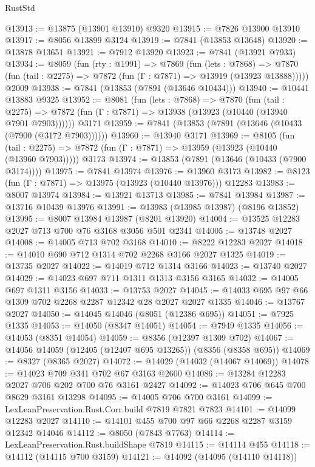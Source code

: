 \begin{lexlean}{RustStd}
\begin{coremodule}
@13913 := @13875 (@13901 @13910) @9320
@13915 := @7826 @13900 @13910
@13917 := @8056 @13899 @3124
@13919 := @7841 (@13853 @13648)
@13920 := @13878 @13651
@13921 := @7912 @13920
@13923 := @7841 (@13921 @7933)
@13934 := @8059
    (fun (rty : @1991) =>
    @7869
      (fun (lets : @7868) =>
      @7870 (fun (tail : @2275) => @7872 (fun (Γ : @7871) => @13919 (@13923 @13888)))))
    @2009
@13938 := @7841 (@13853 (@7891 (@13646 @10434)))
@13940 := @10441 @13883 @9325
@13952 := @8081
    (fun (lets : @7868) =>
    @7870
      (fun (tail : @2275) =>
      @7872 (fun (Γ : @7871) => @13938 (@13923 (@10440 (@13940 @7901 @7903))))))
    @3171
@13959 := @7841 (@13853 (@7891 (@13646 (@10433 (@7900 (@3172 @7903))))))
@13960 := @13940 @3171
@13969 := @8105
    (fun (tail : @2275) => @7872 (fun (Γ : @7871) => @13959 (@13923 (@10440 (@13960 @7903)))))
    @3173
@13974 := @13853 (@7891 (@13646 (@10433 (@7900 @3174))))
@13975 := @7841 @13974
@13976 := @13960 @3173
@13982 := @8123 (fun (Γ : @7871) => @13975 (@13923 (@10440 @13976))) @12283
@13983 := @8007 @13974
@13984 := @13921 @13713
@13985 := @7841 @13984
@13987 := @13716 @10439 @13976
@13991 := @13983 (@13985 @13987) (@8196 @13852)
@13995 := @8007 @13984 @13987 (@8201 @13920)
@14004 := @13525 @12283 @2027 @713 @700 @76 @3168 @3056 @501 @2341
@14005 := @13748 @2027
@14008 := @14005 @713 @702 @3168
@14010 := @8222 @12283 @2027
@14018 := @14010 @690 @712 @1314 @702 @2268 @3166 @2027 @1325
@14019 := @13735 @2027
@14022 := @14019 @712 @1314 @3166
@14023 := @13740 @2027
@14029 := @14023 @697 @711 @1311 @1313 @3156 @3165
@14032 := @14005 @697 @1311 @3156
@14033 := @13753 @2027
@14045 := @14033 @695 @97 @66 @1309 @702 @2268 @2287 @12342 @28 @2027 @2027 @1335
@14046 := @13767 @2027
@14050 := @14045 @14046 (@8051 (@12386 @695))
@14051 := @7925 @1335
@14053 := @14050 (@8347 @14051)
@14054 := @7949 @1335
@14056 := @14053 (@8351 @14054)
@14059 := @8356 (@12397 @1309 @702)
@14067 := @14056 @14059 (@12405 (@12407 @695 @13265)) (@8356 (@8358 @695))
@14069 := @8327 (@8365 @2027)
@14072 := @14029 (@14032 (@14067 @14069))
@14078 := @14023 @709 @341 @702 @67 @3163 @2600
@14086 := @13284 @12283 @2027 @706 @202 @700 @76 @3161 @2427
@14092 := @14023 @706 @645 @700 @8629 @3161 @13298
@14095 := @14005 @706 @700 @3161
@14099 := LexLeanPreservation.Rust.Corr.build @7819 @7821 @7823
@14101 := @14099 @12283 @2027
@14110 := @14101 @455 @700 @97 @66 @2268 @2287 @3159 @12342 @14046
@14112 := @8050 (@7843 @7763)
@14114 := LexLeanPreservation.Rust.buildShape @7819
@14115 := @14114 @455
@14118 := @14112 (@14115 @700 @3159)
@14121 := @14092 (@14095 (@14110 @14118))

\end{coremodule}
\end{lexlean}

